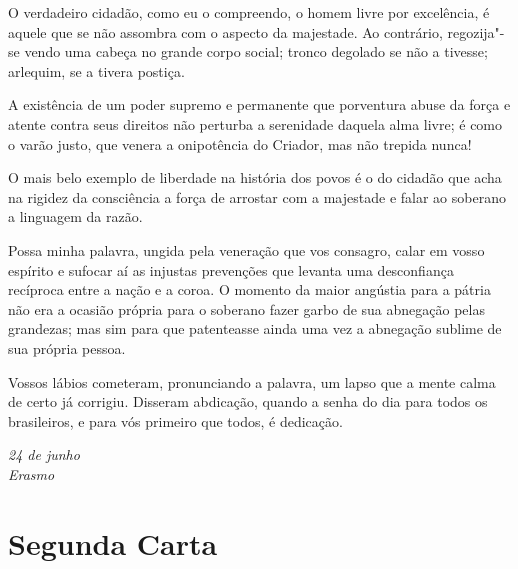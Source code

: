 \begin{linenumbers}
O verdadeiro cidadão, como eu o compreendo, o homem livre por
excelência, é aquele que se não assombra com o aspecto da majestade. Ao
contrário, regozija"-se vendo uma cabeça no grande corpo social;
tronco degolado se não a tivesse; arlequim, se a tivera postiça. 

A existência de um poder supremo e permanente que porventura abuse da
força e atente contra seus direitos não perturba a serenidade daquela
alma livre; é como o varão justo, que venera a onipotência do Criador,
mas não trepida nunca!

O mais belo exemplo de liberdade na história dos povos é o do cidadão
que acha na rigidez da consciência a força de arrostar com a majestade
e falar ao soberano a linguagem da razão.

Possa minha palavra, ungida pela veneração que vos consagro, calar em
vosso espírito e sufocar aí as injustas prevenções que levanta uma
desconfiança recíproca entre a nação e a coroa. O momento da maior
angústia para a pátria não era a ocasião própria para o soberano fazer
garbo de sua abnegação pelas grandezas; mas sim para que patenteasse
ainda uma vez a abnegação sublime de sua própria pessoa.

Vossos lábios cometeram, pronunciando a palavra, um lapso que a mente
calma de certo já corrigiu. Disseram abdicação, quando a senha do dia
para todos os brasileiros, e para vós primeiro que todos, é dedicação.

\end{linenumbers}

\begin{flushright}
\textit{24 de junho\\
Erasmo}
\end{flushright}

\chapter[Segunda Carta]{Segunda Carta}

\vspace*{-1ex}

